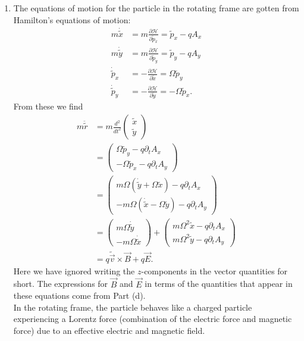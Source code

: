 \documentclass{article}
\theoremstyle{definition}
\newcommand{\p}{\partial}
\newcommand{\ham}{\mathcal{H}}
\newcommand{\f}[2]{\frac{#1}{#2}}
\begin{document}
\begin{enumerate}[label=\alph*)]
	\item The equations of motion for the particle in the rotating frame are gotten from Hamilton's equations of motion:
	\begin{align*}
		m\dot{\tilde{x}} &= m\f{\p \ham}{\p \tilde{p}_x} = \tilde{p}_x - q A_x \\ 
		m\dot{\tilde{y}} &= m\f{\p \ham}{\p \tilde{p}_y} = \tilde{p}_y - q  A_y \\
		\dot{\tilde{p}}_x &= -\f{\p \ham}{\p \tilde{x}} = \Omega \tilde{p}_y \\
		\dot{\tilde{p}}_y &= -\f{\p \ham}{\p \tilde{y}} = -\Omega \tilde{p}_x.
	\end{align*}
	From these we find 
	\begin{align*}
	m\ddot{\tilde{r}} 
	&= 	m\f{d^2}{dt^2} \begin{pmatrix}
			\tilde{x} \\ \tilde{y}
		\end{pmatrix}\\
	&= \begin{pmatrix}
		\Omega \tilde{p}_y - q\p_t A_x\\
		-\Omega \tilde{p}_x - q\p_t A_y
	\end{pmatrix}\\
	&= \begin{pmatrix}
		m\Omega (\dot{\tilde{y}} + \Omega \tilde{x}) - q \p_t A_x \\ 
		-m\Omega(\dot{\tilde{x}} - \Omega \tilde{y}) -q \p_t A_y
	\end{pmatrix} \\
	&= \begin{pmatrix}
		m\Omega \dot{\tilde{y}} \\ -m\Omega \dot{\tilde{x}}
	\end{pmatrix}
	+ \begin{pmatrix}
		m\Omega^2 \tilde{x} - q\p_t A_x \\ m\Omega^2 \tilde{y} - q \p_t A_y
	\end{pmatrix}\\
	&= q \tilde{\vec{v}} \times \vec{B} + q \vec{E}.
	\end{align*}
	Here we have ignored writing the $z$-components in the vector quantities for short. The expressions for $\vec{B}$ and $\vec{E}$ in terms of the quantities that appear in these equations come from Part (d). \\
	
	
	\noindent In the rotating frame, the particle behaves like a charged particle experiencing a Lorentz force (combination of the electric force and magnetic force) due to an effective electric and magnetic field. 
	
	
\end{enumerate}
\end{document}
